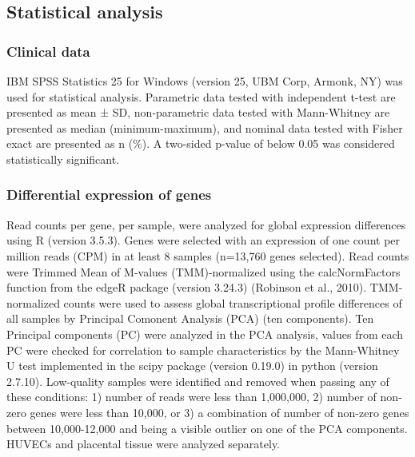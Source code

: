 \documentclass[authordate, empirical]{jote-new-article}
\begin{document}
\subsection{Statistical analysis}



\subsubsection{Clinical data}



IBM SPSS Statistics 25 for Windows (version 25, UBM Corp, Armonk, NY) was used for statistical analysis. Parametric data tested with independent t-test are presented as mean ± SD, non-parametric data tested with Mann-Whitney are presented as median (minimum-maximum), and nominal data tested with Fisher exact are presented as n (\%). A two-sided p-value of below 0.05 was considered statistically significant.


\subsubsection{Differential expression of genes}



Read counts per gene, per sample, were analyzed for global expression differences using R (version 3.5.3). Genes were selected with an expression of one count per million reads (CPM) in at least 8 samples (n=13,760 genes selected). Read counts were Trimmed Mean of M-values (TMM)-normalized using the calcNormFactors function from the edgeR package (version 3.24.3) (Robinson et al., 2010). TMM-normalized counts were used to assess global transcriptional profile differences of all samples by Principal Comonent Analysis (PCA) (ten components). Ten Principal components (PC) were analyzed in the PCA analysis, values from each PC were checked for correlation to sample characteristics by the Mann-Whitney U test implemented in the scipy package (version 0.19.0) in python (version 2.7.10). Low-quality samples were identified and removed when passing any of these conditions: 1) number of reads were less than 1,000,000, 2) number of non-zero genes were less than 10,000, or 3) a combination of number of non-zero genes between 10,000-12,000 and being a visible outlier on one of the PCA components. HUVECs and placental tissue were analyzed separately.
\end{document}

